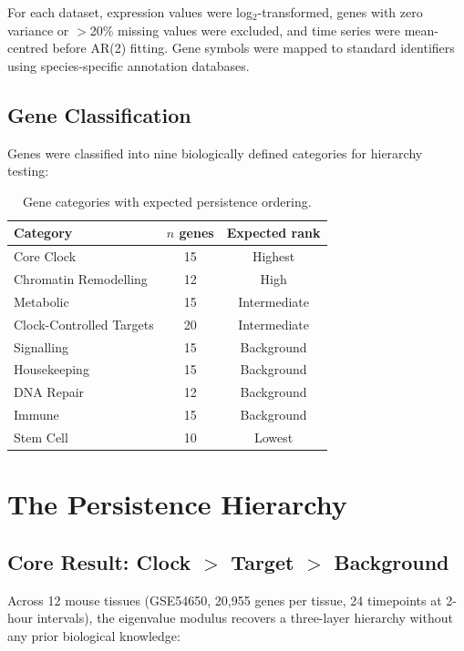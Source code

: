 \documentclass[11pt,letterpaper]{article}
\begin{document}
For each dataset, expression values were log$_2$-transformed, genes with zero variance or $>$20\% missing values were excluded, and time series were mean-centred before AR(2) fitting. Gene symbols were mapped to standard identifiers using species-specific annotation databases.

\subsection{Gene Classification}

Genes were classified into nine biologically defined categories for hierarchy testing:

\begin{table}[H]
\centering
\caption{Gene categories with expected persistence ordering.}
\label{tab:categories}
\begin{tabular}{lcc}
\toprule
\textbf{Category} & \textbf{$n$ genes} & \textbf{Expected rank} \\
\midrule
Core Clock & 15 & Highest \\
Chromatin Remodelling & 12 & High \\
Metabolic & 15 & Intermediate \\
Clock-Controlled Targets & 20 & Intermediate \\
Signalling & 15 & Background \\
Housekeeping & 15 & Background \\
DNA Repair & 12 & Background \\
Immune & 15 & Background \\
Stem Cell & 10 & Lowest \\
\bottomrule
\end{tabular}
\end{table}


\section{The Persistence Hierarchy}
\label{sec:hierarchy}

\subsection{Core Result: Clock $>$ Target $>$ Background}

Across 12 mouse tissues (GSE54650, 20,955 genes per tissue, 24 timepoints at 2-hour intervals), the eigenvalue modulus recovers a three-layer hierarchy without any prior biological knowledge:
\end{document}
